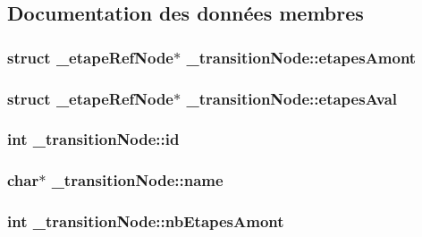 \subsection{Documentation des données membres}
\hypertarget{struct__transitionNode_a3d5635adc21c4fb47681669b7ca1cf59}{
\subsubsection[{etapes\-Amont}]{\setlength{\rightskip}{0pt plus 5cm}struct {\bf \-\_\-etape\-Ref\-Node}$\ast$ \-\_\-transition\-Node\-::etapes\-Amont}}\label{struct__transitionNode_a3d5635adc21c4fb47681669b7ca1cf59}
\hypertarget{struct__transitionNode_ad7b657011977a90b5302903dca76c698}{
\subsubsection[{etapes\-Aval}]{\setlength{\rightskip}{0pt plus 5cm}struct {\bf \-\_\-etape\-Ref\-Node}$\ast$ \-\_\-transition\-Node\-::etapes\-Aval}}\label{struct__transitionNode_ad7b657011977a90b5302903dca76c698}
\hypertarget{struct__transitionNode_aecb2bae359be27f06a0df7c7312d4628}{
\subsubsection[{id}]{\setlength{\rightskip}{0pt plus 5cm}int \-\_\-transition\-Node\-::id}}\label{struct__transitionNode_aecb2bae359be27f06a0df7c7312d4628}
\hypertarget{struct__transitionNode_a607c327fc2b516b64e1ba69b9bac97fe}{
\subsubsection[{name}]{\setlength{\rightskip}{0pt plus 5cm}char$\ast$ \-\_\-transition\-Node\-::name}}\label{struct__transitionNode_a607c327fc2b516b64e1ba69b9bac97fe}
\hypertarget{struct__transitionNode_aae8fd1a66f605f0b96b4acf380331a3e}{
\subsubsection[{nb\-Etapes\-Amont}]{\setlength{\rightskip}{0pt plus 5cm}int \-\_\-transition\-Node\-::nb\-Etapes\-Amont}}\label{struct__transitionNode_aae8fd1a66f605f0b96b4acf380331a3e}
